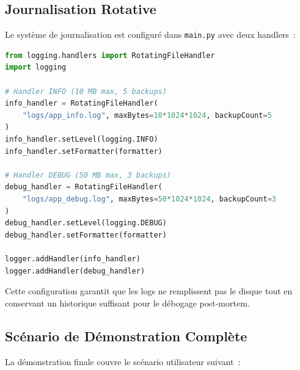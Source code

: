 \subsection{Journalisation Rotative}

Le système de journalisation est configuré dans \texttt{main.py} avec deux handlers~:

\begin{lstlisting}[language=Python, caption={Configuration du logging rotatif}]
from logging.handlers import RotatingFileHandler
import logging

# Handler INFO (10 MB max, 5 backups)
info_handler = RotatingFileHandler(
    "logs/app_info.log", maxBytes=10*1024*1024, backupCount=5
)
info_handler.setLevel(logging.INFO)
info_handler.setFormatter(formatter)

# Handler DEBUG (50 MB max, 3 backups)
debug_handler = RotatingFileHandler(
    "logs/app_debug.log", maxBytes=50*1024*1024, backupCount=3
)
debug_handler.setLevel(logging.DEBUG)
debug_handler.setFormatter(formatter)

logger.addHandler(info_handler)
logger.addHandler(debug_handler)
\end{lstlisting}

Cette configuration garantit que les logs ne remplissent pas le disque tout en conservant un
historique suffisant pour le débogage post-mortem.

\subsection{Scénario de Démonstration Complète}

La démonstration finale couvre le scénario utilisateur suivant~:

